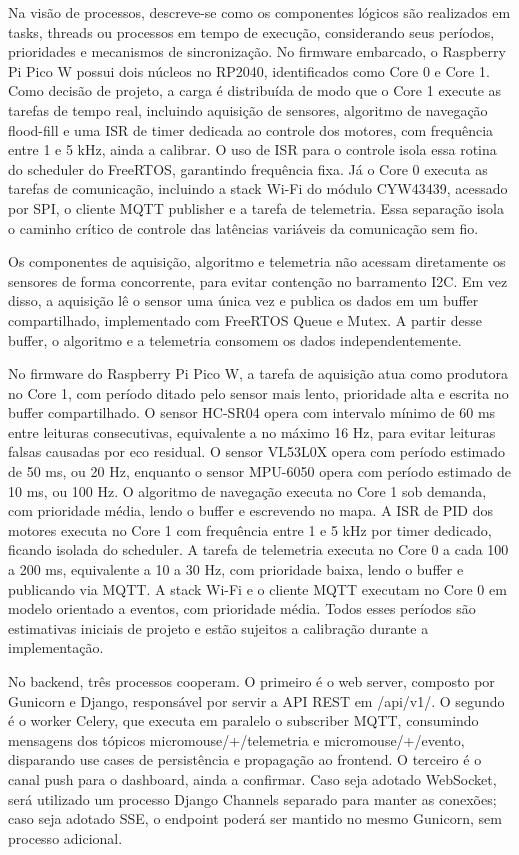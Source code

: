     Na visão de processos, descreve-se como os componentes lógicos são realizados em tasks, threads ou processos em tempo de execução, considerando seus períodos, prioridades e mecanismos de sincronização. No firmware embarcado, o Raspberry Pi Pico W possui dois núcleos no RP2040, identificados como Core 0 e Core 1. Como decisão de projeto, a carga é distribuída de modo que o Core 1 execute as tarefas de tempo real, incluindo aquisição de sensores, algoritmo de navegação flood-fill e uma ISR de timer dedicada ao controle dos motores, com frequência entre 1 e 5 kHz, ainda a calibrar. O uso de ISR para o controle isola essa rotina do scheduler do FreeRTOS, garantindo frequência fixa. Já o Core 0 executa as tarefas de comunicação, incluindo a stack Wi-Fi do módulo CYW43439, acessado por SPI, o cliente MQTT publisher e a tarefa de telemetria. Essa separação isola o caminho crítico de controle das latências variáveis da comunicação sem fio.

    Os componentes de aquisição, algoritmo e telemetria não acessam diretamente os sensores de forma concorrente, para evitar contenção no barramento I2C. Em vez disso, a aquisição lê o sensor uma única vez e publica os dados em um buffer compartilhado, implementado com FreeRTOS Queue e Mutex. A partir desse buffer, o algoritmo e a telemetria consomem os dados independentemente.

    No firmware do Raspberry Pi Pico W, a tarefa de aquisição atua como produtora no Core 1, com período ditado pelo sensor mais lento, prioridade alta e escrita no buffer compartilhado. O sensor HC-SR04 opera com intervalo mínimo de 60 ms entre leituras consecutivas, equivalente a no máximo 16 Hz, para evitar leituras falsas causadas por eco residual. O sensor VL53L0X opera com período estimado de 50 ms, ou 20 Hz, enquanto o sensor MPU-6050 opera com período estimado de 10 ms, ou 100 Hz. O algoritmo de navegação executa no Core 1 sob demanda, com prioridade média, lendo o buffer e escrevendo no mapa. A ISR de PID dos motores executa no Core 1 com frequência entre 1 e 5 kHz por timer dedicado, ficando isolada do scheduler. A tarefa de telemetria executa no Core 0 a cada 100 a 200 ms, equivalente a 10 a 30 Hz, com prioridade baixa, lendo o buffer e publicando via MQTT. A stack Wi-Fi e o cliente MQTT executam no Core 0 em modelo orientado a eventos, com prioridade média. Todos esses períodos são estimativas iniciais de projeto e estão sujeitos a calibração durante a implementação.

    No backend, três processos cooperam. O primeiro é o web server, composto por Gunicorn e Django, responsável por servir a API REST em /api/v1/. O segundo é o worker Celery, que executa em paralelo o subscriber MQTT, consumindo mensagens dos tópicos micromouse/+/telemetria e micromouse/+/evento, disparando use cases de persistência e propagação ao frontend. O terceiro é o canal push para o dashboard, ainda a confirmar. Caso seja adotado WebSocket, será utilizado um processo Django Channels separado para manter as conexões; caso seja adotado SSE, o endpoint poderá ser mantido no mesmo Gunicorn, sem processo adicional.

